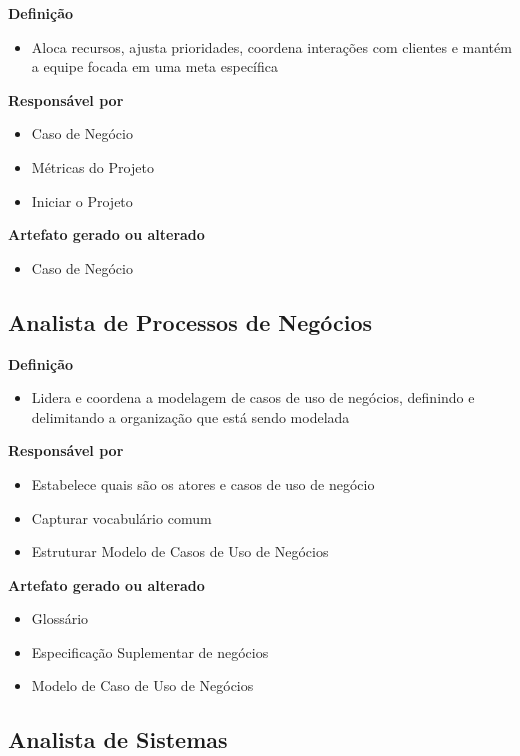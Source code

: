 \textbf{Definição}
\begin{itemize}
\item Aloca recursos, ajusta prioridades, coordena interações com clientes e mantém a equipe focada em uma meta específica
\end{itemize}

\textbf{Responsável por}
\begin{itemize}
\item Caso de Negócio
\item Métricas do Projeto
\item Iniciar o Projeto
\end{itemize}

\textbf{Artefato gerado ou alterado}
\begin{itemize}
\item Caso de Negócio
\end{itemize}

\subsection{Analista de Processos de Negócios}

\textbf{Definição}
\begin{itemize}
\item Lidera e coordena a modelagem de casos de uso de negócios, definindo e delimitando a organização que está sendo modelada
\end{itemize}

\textbf{Responsável por}
\begin{itemize}
\item Estabelece quais são os atores e casos de uso de negócio
\item Capturar vocabulário comum
\item Estruturar Modelo de Casos de Uso de Negócios
\end{itemize}

\textbf{Artefato gerado ou alterado}
\begin{itemize}
\item Glossário
\item Especificação Suplementar de negócios
\item Modelo de Caso de Uso de Negócios
\end{itemize}

\subsection{Analista de Sistemas}

